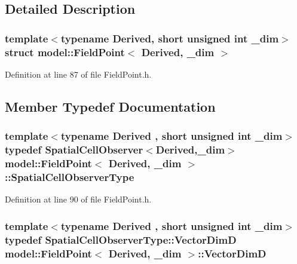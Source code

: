 \subsection{Detailed Description}
\subsubsection*{template$<$typename Derived, short unsigned int \+\_\+dim$>$struct model\+::\+Field\+Point$<$ Derived, \+\_\+dim $>$}



Definition at line 87 of file Field\+Point.\+h.



\subsection{Member Typedef Documentation}
\hypertarget{structmodel_1_1_field_point_3_01_derived_00_01__dim_01_4_aeb51cce408ee0ca3a456271e7ecb0242}{}
\subsubsection[{Spatial\+Cell\+Observer\+Type}]{\setlength{\rightskip}{0pt plus 5cm}template$<$typename Derived , short unsigned int \+\_\+dim$>$ typedef {\bf Spatial\+Cell\+Observer}$<$Derived,\+\_\+dim$>$ {\bf model\+::\+Field\+Point}$<$ Derived, \+\_\+dim $>$\+::{\bf Spatial\+Cell\+Observer\+Type}}\label{structmodel_1_1_field_point_3_01_derived_00_01__dim_01_4_aeb51cce408ee0ca3a456271e7ecb0242}


Definition at line 90 of file Field\+Point.\+h.

\hypertarget{structmodel_1_1_field_point_3_01_derived_00_01__dim_01_4_a4e9a6c1b0d2872fc373a046bf048c37c}{}
\subsubsection[{Vector\+Dim\+D}]{\setlength{\rightskip}{0pt plus 5cm}template$<$typename Derived , short unsigned int \+\_\+dim$>$ typedef {\bf Spatial\+Cell\+Observer\+Type\+::\+Vector\+Dim\+D} {\bf model\+::\+Field\+Point}$<$ Derived, \+\_\+dim $>$\+::{\bf Vector\+Dim\+D}}\label{structmodel_1_1_field_point_3_01_derived_00_01__dim_01_4_a4e9a6c1b0d2872fc373a046bf048c37c}


